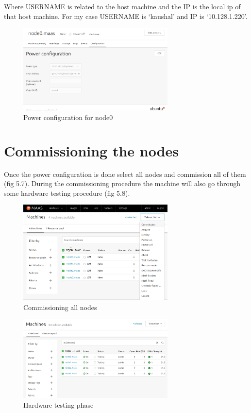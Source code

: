 Where USERNAME is related to the host machine and the IP is the local ip of that host machine. For my case USERNAME is `kaushal' and IP is `10.128.1.220'.

\begin{figure}[!ht]
    \centering
    \includegraphics[width=0.7\textwidth]{images/5-6.png}
    \caption{Power configuration for node0}
\end{figure}

\section{Commissioning the nodes}

Once the power configuration is done select all nodes and commission all of them (fig 5.7). During the commissioning procedure the machine will also go through some hardware testing procedure (fig 5.8).

\begin{figure}[!ht]
    \centering
    \includegraphics[width=0.7\textwidth]{images/5-7.png}
    \caption{Commissioning all nodes}
\end{figure}

\begin{figure}[!ht]
    \centering
    \includegraphics[width=0.7\textwidth]{images/5-8.png}
    \caption{Hardware testing phase}
\end{figure}


